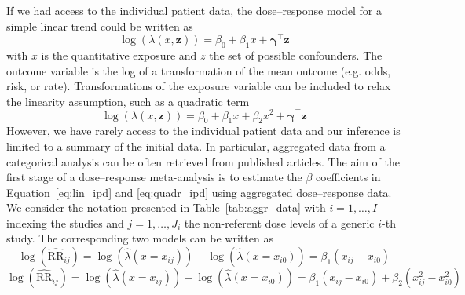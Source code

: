 \documentclass[11pt,a4paper,twoside,openany]{book}\usepackage{knitr}
\begin{document}
{If we had access to the individual patient data, the dose--response model for a simple linear trend could be written as
\begin{equation}
\log \left( \lambda \left(x, \mathbf{z} \right) \right) =  \beta_0 + \beta_1x + \boldsymbol{\gamma}^\top \mathbf{z}
\label{eq:lin_ipd}
\end{equation}
\noindent with $x$ is the quantitative exposure and $z$ the set of possible confounders. The outcome variable is the log of a transformation of the mean outcome (e.g. odds, risk, or rate). Transformations of the exposure variable can be included to relax the linearity assumption, such as a quadratic term
\begin{equation}
\log \left( \lambda \left(x, \mathbf{z} \right) \right) =  \beta_0 + \beta_1x + \beta_2x^2 + \boldsymbol{\gamma}^\top \mathbf{z}
\label{eq:quadr_ipd}
\end{equation}
\noindent However, we have rarely access to the individual patient data and our inference is limited to a summary of the initial data. In particular, aggregated data from a categorical analysis can be often retrieved from published articles. 
\noindent The aim of the first stage of a dose--response meta-analysis is to estimate the $\beta$ coefficients in Equation~\ref{eq:lin_ipd} and \ref{eq:quadr_ipd} using aggregated dose--response data. We consider the notation presented in Table~\ref{tab:aggr_data} with $i = 1, \dots, I$ indexing the studies and $j = 1, \dots, J_i$ the non-referent dose levels of a generic $i$-th study. The corresponding two models can be written as
\begin{equation}
\log \left( \widehat{\mathrm{RR}}_{ij} \right) = \log \left( \hat \lambda \left(x = x_{ij} \right) \right) - \log \left( \hat \lambda \left(x = x_{i0} \right) \right) = \beta_1\left(x_{ij} - x_{i0} \right)
\label{eq:lin_ad}
\end{equation}
\begin{equation}
\log \left( \widehat{\mathrm{RR}}_{ij} \right) = \log \left( \hat \lambda \left(x = x_{ij} \right) \right) - \log \left( \hat \lambda \left(x = x_{i0} \right) \right) = \beta_1\left(x_{ij} - x_{i0} \right) + \beta_2\left(x_{ij}^2 - x_{i0}^2 \right)
\label{eq:quadr_ad}
\end{equation}

}
\end{document}

